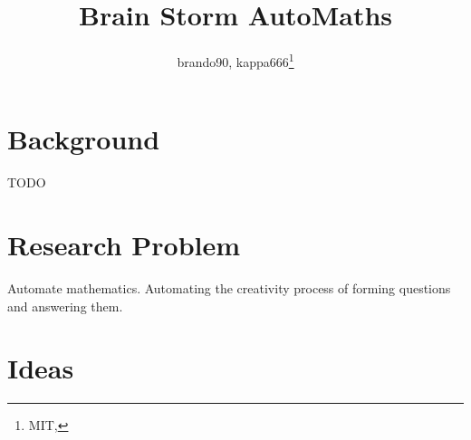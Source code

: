 \documentclass[11pt]{article}
\title{Brain Storm AutoMaths}
\author{brando90, kappa666\footnote{ MIT, \email{brando90, kappa666}}}
\makeatletter
\let\inserttitle\@title
\let\insertauthor\@author
\makeatother
\begin{document}
\begin{center}
  \LARGE{\inserttitle}

  \Large{\insertauthor}
\end{center}

\section{Background}

TODO

\section{Research Problem}

Automate mathematics. Automating the creativity process of forming questions and answering them. 

\section{Ideas}
\end{document}
